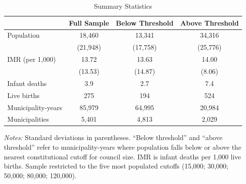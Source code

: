 \begin{table}[htbp]
\centering
\caption{Summary Statistics}
\label{tab:summary}
\begin{tabular}{lccc}
\toprule
 & Full Sample & Below Threshold & Above Threshold \\
\midrule
Population & 18,460 & 13,341 & 34,316 \\
 & (21,948) & (17,758) & (25,776) \\
IMR (per 1,000) & 13.72 & 13.63 & 14.00 \\
 & (13.53) & (14.87) & (8.06) \\
Infant deaths & 3.9 & 2.7 & 7.4 \\
Live births & 275 & 194 & 524 \\
\midrule
Municipality-years & 85,979 & 64,995 & 20,984 \\
Municipalities & 5,401 & 4,813 & 2,029 \\
\bottomrule
\end{tabular}
\begin{tablenotes}[flushleft]\small
\item \textit{Notes:} Standard deviations in parentheses. ``Below threshold'' and ``above threshold'' refer to municipality-years where population falls below or above the nearest constitutional cutoff for council size. IMR is infant deaths per 1,000 live births. Sample restricted to the five most populated cutoffs (15,000; 30,000; 50,000; 80,000; 120,000).
\end{tablenotes}
\end{table}

